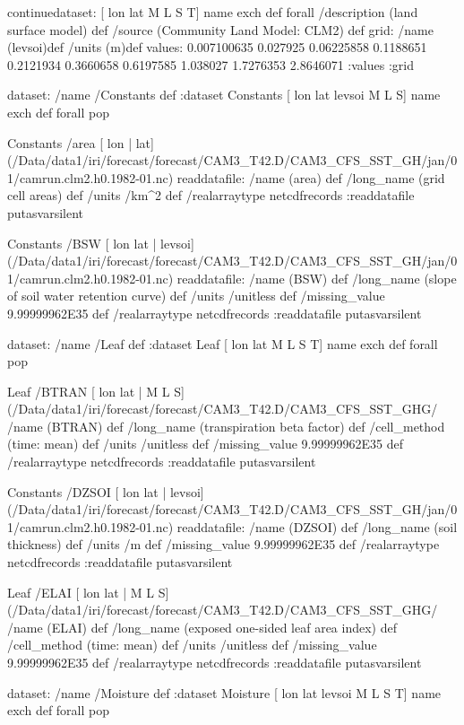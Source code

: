 \begin{ingrid}
continuedataset:
[ lon lat M L S T] {name exch def} forall
/description (land surface model) def
/source (Community Land Model: CLM2) def
grid:
/name (levsoi)def
/units (m)def
values: 0.007100635 0.027925 0.06225858 0.1188651 0.2121934 0.3660658 0.6197585 1.038027 1.7276353 2.8646071 :values
:grid

dataset: /name /Constants def :dataset
Constants [ lon lat levsoi M L S] {name exch def} forall pop

Constants /area{
[ lon | lat] 
(/Data/data1/iri/forecast/forecast/CAM3_T42.D/CAM3_CFS_SST_GH/jan/01/camrun.clm2.h0.1982-01.nc)
 readdatafile:
/name (area) def
 /long_name (grid cell areas) def
 /units /km^2 def
 /realarraytype netcdfrecords :readdatafile
}putasvarsilent




Constants /BSW{
[ lon lat | levsoi](/Data/data1/iri/forecast/forecast/CAM3_T42.D/CAM3_CFS_SST_GH/jan/01/camrun.clm2.h0.1982-01.nc) readdatafile:
/name (BSW) def
 /long_name (slope of soil water retention curve) def
 /units /unitless def
 /missing_value 9.99999962E35 def
 /realarraytype netcdfrecords :readdatafile
}putasvarsilent

dataset: /name /Leaf def :dataset
Leaf [ lon lat M L S T] {name exch def} forall pop

Leaf /BTRAN{
[ lon lat | M L S] (/Data/data1/iri/forecast/forecast/CAM3_T42.D/CAM3_CFS_SST_GHG/%
/name (BTRAN) def
 /long_name (transpiration beta factor) def
 /cell_method (time: mean) def
 /units /unitless def
 /missing_value 9.99999962E35 def
 /realarraytype netcdfrecords :readdatafile
}putasvarsilent

Constants /DZSOI{
[ lon lat | levsoi] (/Data/data1/iri/forecast/forecast/CAM3_T42.D/CAM3_CFS_SST_GH/jan/01/camrun.clm2.h0.1982-01.nc) readdatafile:
/name (DZSOI) def
 /long_name (soil thickness) def
 /units /m def
 /missing_value 9.99999962E35 def
 /realarraytype netcdfrecords :readdatafile
}putasvarsilent


Leaf /ELAI{
[ lon lat | M L S] (/Data/data1/iri/forecast/forecast/CAM3_T42.D/CAM3_CFS_SST_GHG/%
/name (ELAI) def
 /long_name (exposed one-sided leaf area index) def
 /cell_method (time: mean) def
 /units /unitless def
 /missing_value 9.99999962E35 def
 /realarraytype netcdfrecords :readdatafile
}putasvarsilent

dataset: /name /Moisture def :dataset
Moisture [ lon lat levsoi M L S T] {name exch def} forall pop


\end{ingrid}
